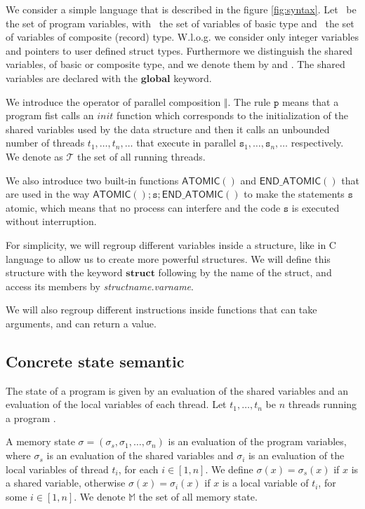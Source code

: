 \documentclass[runningheads]{llncs}
\newcommand\prule{\mathtt{p}}
\newcommand\srule{\mathtt{s}}
\newcommand{\structinst}{\mathbf{struct}}
\newcommand{\globalinst}{\mathbf{global}}
\newcommand{\atomicbegin}{\mathsf{ATOMIC()}}
\newcommand{\atomicend}{\mathsf{END\_ATOMIC()}}
\newcommand{\Memory}{\mathbb{M}}
\newcommand{\Thread}{\mathcal T}
\begin{document}
	We consider a simple language that is described in the figure \ref{fig:syntax}. Let \vars\ be the set of program variables, with \nvars\ the set of  variables of basic type and \pvars\ the set of variables of composite (record) type. 
W.l.o.g. we consider only integer variables  and pointers to user defined struct types. 
Furthermore we distinguish the shared variables, of basic or composite type, and we denote them by \snvars and \spvars. The shared variables are declared with the $\globalinst$ keyword.

 We introduce the operator of parallel composition $\Vert$. The rule $\prule$ means that a program fist calls an $init$ function which corresponds to the initialization of the shared variables used by the data structure and then it calls an unbounded number of threads $t_1, \dots, t_n, \dots$ that execute in parallel $\srule_1, \dots, \srule_n, \dots$ respectively. We denote as $\Thread$ the set of all running threads. 
 
	We also introduce two built-in functions $\atomicbegin$ and $\atomicend$ that are used in the way $\atomicbegin ; \srule ; \atomicend$ to make the statements $\srule$ atomic, which means that no process can interfere and the code $\srule$ is executed without interruption. 
	
	For simplicity, we will regroup different variables inside a structure, like in C language to allow us to create more powerful structures. We will define this structure with the keyword $\structinst$ following by the name of the struct, and access its members by \textit{structname.varname}. 
	
We will also regroup different instructions inside functions that can take arguments, and can return a value.
	
	\subsection{Concrete state semantic}
	
	

The state of a program is given by an evaluation of the shared variables and an evaluation of the local variables of each thread. 
Let $t_1,\ldots, t_n$ be $n$ threads running a program \prog. 



A memory state $\sigma=(\sigma_s, \sigma_{1}, \ldots ,\sigma_{n})$ is an evaluation of the program variables, where $\sigma_s$ is an evaluation of the shared variables and $\sigma_{i}$ is an evaluation of the local variables of thread $t_i$, for each $i\in [1,n]$. 
We define 
$\sigma(x)=\sigma_s(x)$ if $x$ is a shared variable, otherwise $\sigma(x)=\sigma_i(x)$ if $x$ is a local variable of $t_i$, for some $i\in[1,n]$.  We denote $\Memory$ the set of all memory state. 
\end{document}
